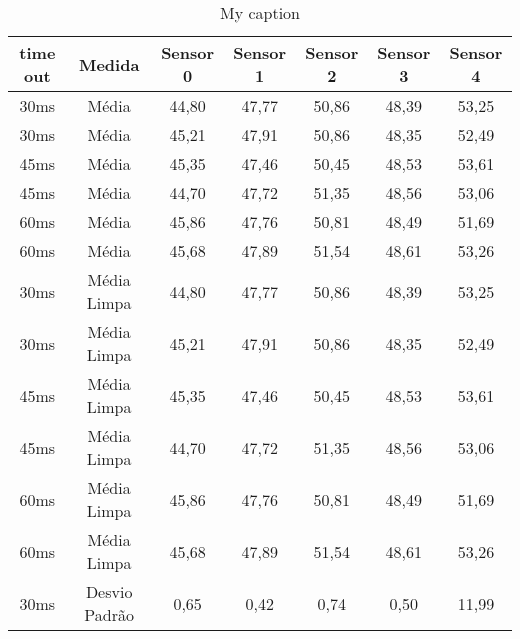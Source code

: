 \begin{table}[]
\centering
\caption{My caption}
\label{my-label}
\begin{tabular}{|c|c|ccccc|}
\hline
\textbf{time out} & \textbf{Medida}     & \textbf{Sensor 0} & \textbf{Sensor 1} & \textbf{Sensor 2} & \textbf{Sensor 3} & \textbf{Sensor 4} \\ \hline
30ms              & Média               & 44,80             & 47,77             & 50,86             & 48,39             & 53,25             \\
30ms              & Média               & 45,21             & 47,91             & 50,86             & 48,35             & 52,49             \\
45ms              & Média               & 45,35             & 47,46             & 50,45             & 48,53             & 53,61             \\
45ms              & Média               & 44,70             & 47,72             & 51,35             & 48,56             & 53,06             \\
60ms              & Média               & 45,86             & 47,76             & 50,81             & 48,49             & 51,69             \\
60ms              & Média               & 45,68             & 47,89             & 51,54             & 48,61             & 53,26             \\ \hline
30ms              & Média Limpa         & 44,80             & 47,77             & 50,86             & 48,39             & 53,25             \\
30ms              & Média Limpa         & 45,21             & 47,91             & 50,86             & 48,35             & 52,49             \\
45ms              & Média Limpa         & 45,35             & 47,46             & 50,45             & 48,53             & 53,61             \\
45ms              & Média Limpa         & 44,70             & 47,72             & 51,35             & 48,56             & 53,06             \\
60ms              & Média Limpa         & 45,86             & 47,76             & 50,81             & 48,49             & 51,69             \\
60ms              & Média Limpa         & 45,68             & 47,89             & 51,54             & 48,61             & 53,26             \\ \hline
30ms              & Desvio Padrão       & 0,65              & 0,42              & 0,74              & 0,50              & 11,99             \\

\end{tabular}
\end{table}
